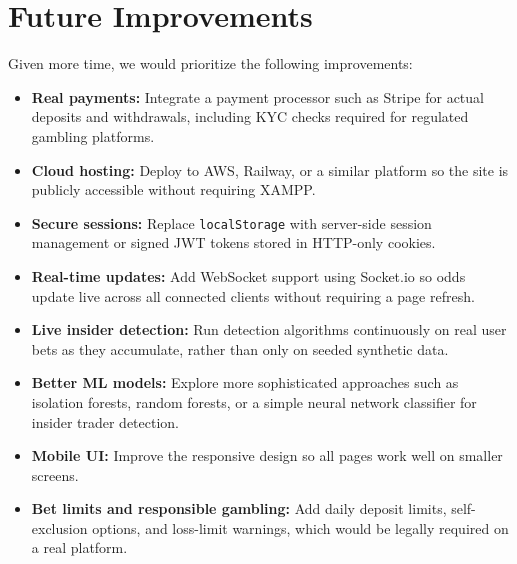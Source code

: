 \documentclass[sigconf,nonacm]{acmart}
\begin{document}
\section{Future Improvements}

Given more time, we would prioritize the following improvements:

\begin{itemize}
  \item \textbf{Real payments:} Integrate a payment processor such as
  Stripe for actual deposits and withdrawals, including KYC checks
  required for regulated gambling platforms.
  \item \textbf{Cloud hosting:} Deploy to AWS, Railway, or a similar
  platform so the site is publicly accessible without requiring XAMPP.
  \item \textbf{Secure sessions:} Replace \texttt{localStorage} with
  server-side session management or signed JWT tokens stored in
  HTTP-only cookies.
  \item \textbf{Real-time updates:} Add WebSocket support using
  Socket.io so odds update live across all connected clients without
  requiring a page refresh.
  \item \textbf{Live insider detection:} Run detection algorithms
  continuously on real user bets as they accumulate, rather than only
  on seeded synthetic data.
  \item \textbf{Better ML models:} Explore more sophisticated
  approaches such as isolation forests, random forests, or a simple
  neural network classifier for insider trader detection.
  \item \textbf{Mobile UI:} Improve the responsive design so all pages
  work well on smaller screens.
  \item \textbf{Bet limits and responsible gambling:} Add daily deposit
  limits, self-exclusion options, and loss-limit warnings, which would
  be legally required on a real platform.
\end{itemize}

\nocite{jamilCS360}


\end{document}
